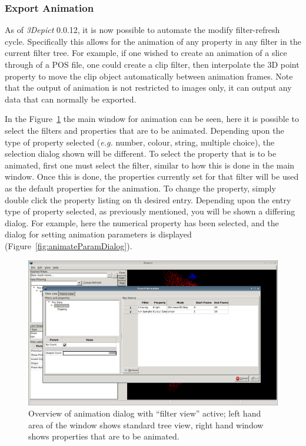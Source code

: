\documentclass[10pt]{article}
\begin{document}
\subsubsection{Export Animation}
\label{sec:animationExport}As of \emph{3Depict} 0.0.12, it is now possible to automate the modify filter-refresh cycle. Specifically this allows for the animation of any property in any filter in the current filter tree. For example, if one wished to create an animation of a slice through of a POS file, one could create a clip filter, then interpolate the 3D point property to move the clip object automatically between animation frames. Note that the output of animation is not restricted to images only, it can output any data that can normally be exported. 


In the Figure~\ref{fig:animateFilterView} the main window for animation can be seen, here it is possible to select the filters and properties that are to be animated. Depending upon the type of property selected (\emph{e.g.} number, colour, string, multiple choice), the selection dialog shown will be different.  To select the property that is to be animated, first one must select the filter, similar to how this is done in the main window. Once this is done, the properties currently set for that filter will be used as the default properties for the animation. To change the property, simply double click the property listing on th desired entry. Depending upon the entry type of property selected, as previously mentioned, you will be shown a differing dialog. For example, here the numerical property has been selected, and the dialog for setting animation parameters is displayed (Figure~\ref{fig:animateParamDialog}). 

\begin{figure}
\begin{center}
 \includegraphics[width=0.9 \textwidth,keepaspectratio=true]{./figures/exportanimDialogFilterView.png}
 \caption{Overview of animation dialog with ``filter view'' active; left hand area of the window shows standard tree view, right hand window shows properties that are to be animated.}
\label{fig:animateFilterView}
\end{center}
\end{figure}
\end{document}
